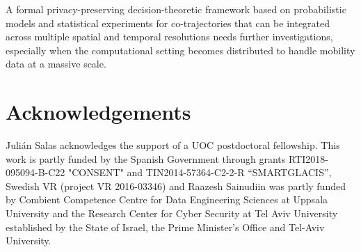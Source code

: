 \documentclass[times,twocolumn,final,authoryear]{elsarticle}
\begin{document}
A formal privacy-preserving decision-theoretic framework based on probabilistic models and statistical experiments for co-trajectories that can be integrated across multiple spatial and temporal resolutions needs further investigations, especially when the computational setting becomes distributed to handle mobility data at a massive scale.

\section*{Acknowledgements}
Juli\'{a}n Salas acknowledges the support of a UOC postdoctoral fellowship.
This work is partly funded by the Spanish Government through grants  RTI2018-095094-B-C22 "CONSENT" and TIN2014-57364-C2-2-R ``SMARTGLACIS'', Swedish VR (project VR 2016-03346) and Raazesh Sainudiin was partly funded by Combient Competence Centre for Data Engineering Sciences at Uppsala University and the Research Center for Cyber Security at Tel Aviv University established by the State of Israel, the Prime Minister's Office and Tel-Aviv University.






\end{document}
